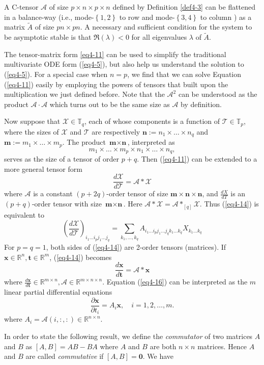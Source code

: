 \documentclass[11pt, oneside]{article}  %
\newcommand{\partl}{\partial}
\newcommand{\set}[1]{\left\{#1\right\}}
\newcommand{\la}{\lambda}
\newcommand{\RR}{\mathbb{R}}
\newcommand{\TT}{\mathbb{T}}
\newcommand{\A}{\mathcal{A}}
\newcommand{\T}{\mathcal{T}}
\newcommand{\X}{\mathcal{X}}
\newcommand{\bfm}{\textbf{m}}
\newcommand{\bfn}{\textbf{n}}
\newcommand{\bft}{\textbf{t}}
\newcommand{\bx}{\textbf{x}}
\newcommand{\beq}{\begin{equation}}
\newcommand{\eeq}{\end{equation}}
\begin{document}
A C-tensor $\A$ of size $p\times n\times p\times n$ defined by Definition \ref{def4-3} can be flattened in a balance-way (i.e., mode-$\set{1,2}$ 
to row and mode-$\set{3,4}$ to column ) as a matrix $\tilde{A}$ of size $pn\times pn$.  A necessary and sufficient condition for the system to be 
asymptotic stable is that $\Re(\la)<0$ for all eigenvalues $\la$ of $\tilde{A}$. 

The tensor-matrix form \eqref{eq4-11} can be used to simplify the traditional multivariate ODE form (\ref{eq4-5}), but also help us understand 
the solution to (\ref{eq4-5}). For a special case when $n=p$,  we find that we can solve Equation (\ref{eq4-11}) easily by employing the powers 
of tensors that built upon the multiplication we just defined before. Note that the $\A^{2}$ can be understood as the product $\A\cdot \A$ which 
turns out to be the same size as $\A$ by definition.

Now suppose that $\X\in\TT_{q}$, each of whose components is a function of $\T\in\TT_{p}$, where the sizes of $\X$ and $\T$ are respectively 
$\bfn:=n_{1}\times \ldots \times n_{q}$ and $\bfm:=m_{1}\times \ldots \times m_{p}$.  The product $\bfm\times \bfn$, interpreted as 
\[ 
m_{1}\times \ldots \times m_{p}\times n_{1}\times \ldots \times n_{q},  
\]
serves as the size of a tensor of order $p+q$.  Then (\ref{eq4-11}) can be extended to a more general tensor form 
\beq\label{eq4-14}
\frac{d\X}{d\T} = \A\ast \X
\eeq
where $\A$ is a constant $(p+2q)$-order tensor of size $\bfm\times \bfn\times \bfn$, and $\frac{dX}{dT}$ is an $(p+q)$-order tensor with size 
$\bfm\times\bfn$.  Here $\A\ast \X=\A\ast_{[q]}\X$.  Thus (\ref{eq4-14}) is equivalent to 
\beq\label{eq4-15}
\left(\frac{d\X}{d\T}\right)_{i_{1}\ldots i_{p} j_{1}\ldots j_{q}} 
= \sum_{k_{1},\ldots,k_{q}} A_{i_{1}\ldots i_{p} j_{1}\ldots j_{q}k_{1}\ldots k_{q}}X_{k_{1}\ldots k_{q}}
\eeq
For $p=q=1$, both sides of (\ref{eq4-14}) are 2-order tensors (matrices). If $\bx\in\RR^{n},\bft\in\RR^{m}$, (\ref{eq4-14}) becomes 
\beq\label{eq4-16}
\frac{d\bx}{d\bft} = \A\ast\bx
\eeq
where $\frac{d\bx}{d\bft}\in\RR^{m\times n}, \A\in\RR^{m\times n\times n}$.  Equation (\ref{eq4-16}) can be interpreted as the $m$ 
linear partial differential equations 
\beq\label{eq4-17}
\frac{\partl \bx}{\partl t_{i}} =A_{i}\bx, \quad  i=1,2,\ldots, m.   
\eeq
where $A_{i}=\A(i,:,:)\in\RR^{n\times n}$.   

In order to state the following result, we define the \emph{commutator} of two matrices $A$ and $B$ as $[A, B] = AB -BA$ where $A$ and $B$ are both $n\times n$ matrices.  Hence $A$ and $B$ are called \emph{commutative} if $[A,B] = \mathbf{0}$.  We have    
\end{document}

